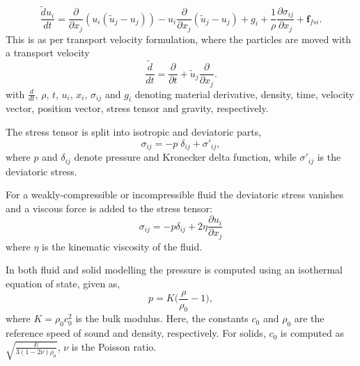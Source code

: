 \documentclass[10pt, conference]{FMFP2022}
\newcommand{\teng}[1]{\ensuremath{\boldsymbol{#1}}}
\begin{document}
\begin{equation}
  \label{eq:mom-tvf}
  \frac{\tilde{d} u_i}{d t} =
  \frac{\partial}{\partial x_j} (u_i (\tilde{u}_j - u_j))
  - u_i \frac{\partial}{\partial x_j} (\tilde{u}_j - u_j)
  + g_i
  +\frac{1}{\rho} \frac{\partial \sigma_{ij}}{\partial x_j} + \teng{f}_{fsi}.
\end{equation}
This is as per transport velocity formulation, where the particles are moved with
a transport velocity
\begin{equation}
  \label{eq:modified-material-derivative}
  \frac{\tilde{d} }{d t} = \frac{\partial }{\partial t} +
  \tilde{u}_j \frac{\partial }{\partial x_j}.
\end{equation}
with $\frac{{d} }{d t}$, $\rho$, $t$, $u_i$, $x_i$, $\sigma_{ij}$ and $g_{i}$
denoting material derivative, density, time, velocity vector, position vector,
stress tensor and gravity, respectively.


The stress tensor is split into isotropic and deviatoric parts,
\begin{equation}
  \label{eq:stress_tensor_decomposition}
  \sigma_{ij} = - p \; \delta_{ij} + \sigma'_{ij},
\end{equation}
where $p$ and $\delta_{ij}$ denote pressure and Kronecker delta function, while
$\sigma'_{ij}$ is the deviatoric stress.


For a weakly-compressible or incompressible fluid the deviatoric stress
vanishes and a viscous force is added to the stress tensor:
\begin{equation}
  \label{eq:fluid-stress-decomposition}
  \sigma_{ij} = - p \delta_{ij} + 2 \eta \frac{\partial u_i}{\partial x_j}
\end{equation}
where $\eta$ is the kinematic viscosity of the fluid.

In both fluid and solid modelling the pressure is computed using an
isothermal equation of state, given as,
\begin{equation}
  \label{eq:pressure-equation}
  p = K \bigg(\frac{\rho}{\rho_{0}} - 1 \bigg),
\end{equation}
where $K = \rho_{0} c_0^2$ is the bulk modulus. Here, the constants $c_0$ and
$\rho_0$ are the reference speed of sound and density, respectively. For solids,
$c_0$ is computed as $\sqrt{\frac{E}{3 (1 - 2 \nu)\rho_{0}}}$, $\nu$ is the
Poisson ratio.
\end{document}
